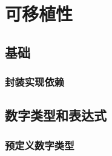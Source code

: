 %
%
%

\chapter{可移植性}

\section{基础} %
\subsection{封装实现依赖} %
\label{c:portability:fundamental:encapsulating}

\section{数字类型和表达式}
\subsection{预定义数字类型} %
\label{c:portability:num-type:pre-def-num-type}

